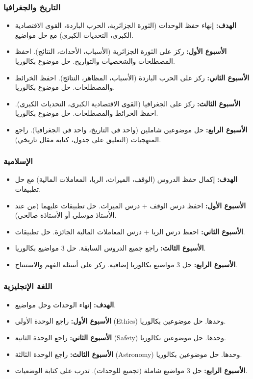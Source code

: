 \documentclass[12pt,a4paper]{book}
\begin{document}
	\subsubsection*{التاريخ والجغرافيا}
	\begin{itemize}
		\item \textbf{الهدف:} إنهاء حفظ الوحدات (الثورة الجزائرية، الحرب الباردة، القوى الاقتصادية الكبرى، التحديات الكبرى) مع حل مواضيع.
		\item \textbf{الأسبوع الأول:} ركز على الثورة الجزائرية (الأسباب، الأحداث، النتائج). احفظ المصطلحات والشخصيات والتواريخ. حل موضوع بكالوريا.
		\item \textbf{الأسبوع الثاني:} ركز على الحرب الباردة (الأسباب، المظاهر، النتائج). احفظ الخرائط والمصطلحات. حل موضوع بكالوريا.
		\item \textbf{الأسبوع الثالث:} ركز على الجغرافيا (القوى الاقتصادية الكبرى، التحديات الكبرى). احفظ الخرائط والمصطلحات. حل موضوع بكالوريا.
		\item \textbf{الأسبوع الرابع:} حل موضوعين شاملين (واحد في التاريخ، واحد في الجغرافيا). راجع المنهجيات (التعليق على جدول، كتابة مقال تاريخي).
	\end{itemize}
	
	\subsubsection*{الإسلامية}
	\begin{itemize}
		\item \textbf{الهدف:} إكمال حفظ الدروس (الوقف، الميراث، الربا، المعاملات المالية) مع حل تطبيقات.
		\item \textbf{الأسبوع الأول:} احفظ درس الوقف + درس الميراث. حل تطبيقات عليهما (من عند الأستاذ موسلي أو الأستاذة صالحي).
		\item \textbf{الأسبوع الثاني:} احفظ درس الربا + درس المعاملات المالية الجائزة. حل تطبيقات.
		\item \textbf{الأسبوع الثالث:} راجع جميع الدروس السابقة. حل 3 مواضيع بكالوريا.
		\item \textbf{الأسبوع الرابع:} حل 3 مواضيع بكالوريا إضافية. ركز على أسئلة الفهم والاستنتاج.
	\end{itemize}
	
	\subsubsection*{اللغة الإنجليزية}
	\begin{itemize}
		\item \textbf{الهدف:} إنهاء الوحدات  وحل مواضيع.
		\item \textbf{الأسبوع الأول:} راجع الوحدة الأولى (Ethics) وحدها. حل موضوعين بكالوريا.
		\item \textbf{الأسبوع الثاني:} راجع الوحدة الثانية (Safety) وحدها. حل موضوعين بكالوريا.
		\item \textbf{الأسبوع الثالث:} راجع الوحدة الثالثة (Astronomy) وحدها. حل موضوعين بكالوريا.
		\item \textbf{الأسبوع الرابع:} حل 3 مواضيع شاملة (تجميع للوحدات). تدرب على كتابة الوضعيات.
	\end{itemize}
	
\end{document}

